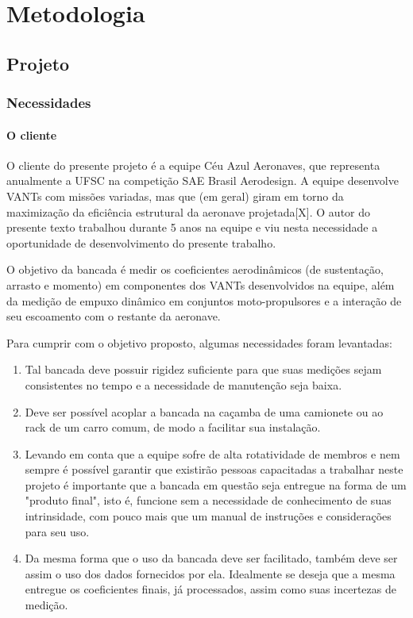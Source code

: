 \chapter{Metodologia}\label{chp:met}

\section{Projeto}

\subsection{Necessidades}

\subsubsection{O cliente}
O cliente do presente projeto é a equipe Céu Azul Aeronaves, que representa anualmente a UFSC na competição SAE Brasil Aerodesign. A equipe desenvolve VANTs com missões variadas, mas que (em geral) giram em torno da maximização da eficiência estrutural da aeronave projetada[X]. O autor do presente texto trabalhou durante 5 anos na equipe e viu nesta necessidade a oportunidade de desenvolvimento do presente trabalho.

O objetivo da bancada é medir os coeficientes aerodinâmicos (de sustentação, arrasto e momento) em componentes dos VANTs desenvolvidos na equipe, além da medição de empuxo dinâmico em conjuntos moto-propulsores e a interação de seu escoamento com o restante da aeronave.

Para cumprir com o objetivo proposto, algumas necessidades foram levantadas:

\begin{enumerate}
    \item Tal bancada deve possuir rigidez suficiente para que suas medições sejam consistentes no tempo e a necessidade de manutenção seja baixa.
    \item Deve ser possível acoplar a bancada na caçamba de uma camionete ou ao rack de um carro comum, de modo a facilitar sua instalação.
    \item Levando em conta que a equipe sofre de alta rotatividade de membros e nem sempre é possível garantir que existirão pessoas capacitadas a trabalhar neste projeto é importante que a bancada em questão seja entregue na forma de um "produto final", isto é, funcione sem a necessidade de conhecimento de suas intrinsidade, com pouco mais que um manual de instruções e considerações para seu uso.
    \item Da mesma forma que o uso da bancada deve ser facilitado, também deve ser assim o uso dos dados fornecidos por ela. Idealmente se deseja que a mesma entregue os coeficientes finais, já processados, assim como suas incertezas de medição.
\end{enumerate}

